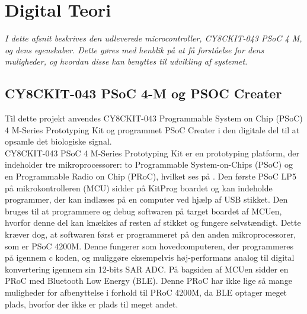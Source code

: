 \section{Digital Teori}
\textit{I dette afsnit beskrives den udleverede microcontroller, CY8CKIT-043 PSoC 4 M, og dens egenskaber. Dette gøres med henblik på at få forståelse for dens muligheder, og hvordan disse kan benyttes til udvikling af systemet.}

\subsection{CY8CKIT-043 PSoC 4-M og PSOC Creater}
Til dette projekt anvendes CY8CKIT-043 Programmable System on Chip (PSoC) 4 M-Series Prototyping Kit og programmet PSoC Creater i den digitale del til at opsamle det biologiske signal.\\
CY8CKIT-043 PSoC 4 M-Series Prototyping Kit er en prototyping platform, der indeholder tre mikroprocessorer: to Programmable System-on-Chips (PSoC) og en Programmable Radio on Chip (PRoC), hvilket ses på . Den første PSoC LP5 på mikrokontrolleren (MCU) sidder på KitProg boardet og kan indeholde programmer, der kan indlæses på en computer ved hjælp af USB stikket. Den bruges til at programmere og debug softwaren på target boardet af MCUen, hvorfor denne del kan knækkes af resten af stikket og fungere selvstændigt. Dette kræver dog, at softwaren først er programmeret på den anden mikroprocessorer, som er PSoC 4200M. Denne fungerer som hovedcomputeren, der programmeres på igennem c koden, og muliggøre eksempelvis høj-performans analog til digital konvertering igennem sin 12-bits SAR ADC. På bagsiden af MCUen sidder en PRoC med Bluetooth Low Energy (BLE). Denne PRoC har ikke lige så mange muligheder for afbenyttelse i forhold til PRoC 4200M, da BLE optager meget plads, hvorfor der ikke er plads til meget andet. \citep{CYPRESS2016PSoC,Semiconductor2016,CYPRESS2016Cortexm0}
